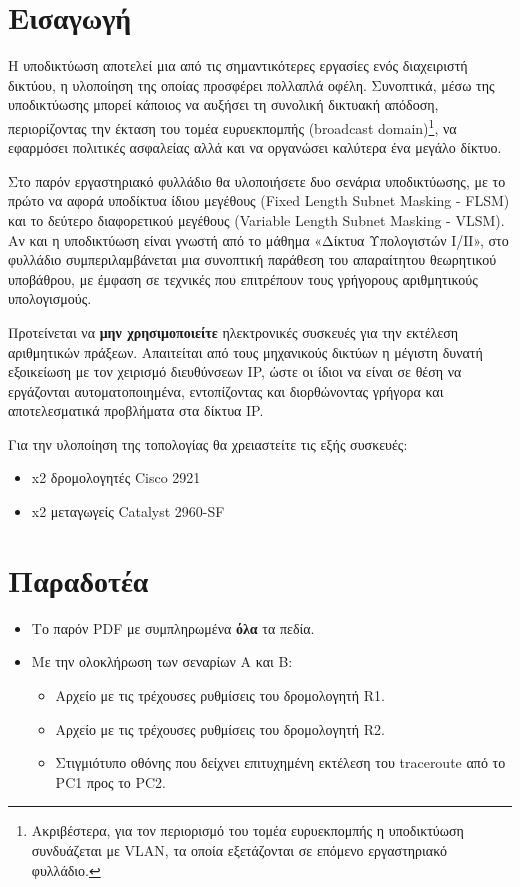 \documentclass{EdipyLabs} %
\begin{document}
\Initialize

\section*{Εισαγωγή}
Η υποδικτύωση αποτελεί μια από τις σημαντικότερες εργασίες ενός διαχειριστή δικτύου, η υλοποίηση της οποίας προσφέρει πολλαπλά οφέλη. Συνοπτικά, μέσω της υποδικτύωσης μπορεί κάποιος να αυξήσει τη συνολική δικτυακή απόδοση, περιορίζοντας την έκταση του τομέα ευρυεκπομπής (broadcast domain)\footnote{Ακριβέστερα, για τον περιορισμό του τομέα ευρυεκπομπής η υποδικτύωση συνδυάζεται με VLAN, τα οποία εξετάζονται σε επόμενο εργαστηριακό φυλλάδιο.}, να εφαρμόσει πολιτικές ασφαλείας αλλά και να οργανώσει καλύτερα ένα μεγάλο δίκτυο. 

Στο παρόν εργαστηριακό φυλλάδιο θα υλοποιήσετε δυο σενάρια υποδικτύωσης, με το πρώτο να αφορά υποδίκτυα ίδιου μεγέθους (Fixed Length Subnet Masking - FLSM) και το δεύτερο διαφορετικού μεγέθους (Variable Length Subnet Masking - VLSM). Αν και η υποδικτύωση είναι γνωστή από το μάθημα «Δίκτυα Υπολογιστών Ι/ΙΙ», στο φυλλάδιο συμπεριλαμβάνεται μια συνοπτική παράθεση του απαραίτητου θεωρητικού υποβάθρου, με έμφαση σε τεχνικές που επιτρέπουν τους γρήγορους αριθμητικούς υπολογισμούς. 

\begin{warningblock}
	Προτείνεται να \textbf{μην χρησιμοποιείτε} ηλεκτρονικές συσκευές για την εκτέλεση αριθμητικών πράξεων. Απαιτείται από τους μηχανικούς δικτύων η μέγιστη δυνατή εξοικείωση με τον χειρισμό διευθύνσεων IP, ώστε οι ίδιοι να είναι σε θέση να εργάζονται αυτοματοποιημένα, εντοπίζοντας και διορθώνοντας γρήγορα και αποτελεσματικά προβλήματα στα δίκτυα IP.
\end{warningblock}

Για την υλοποίηση της τοπολογίας θα χρειαστείτε τις εξής συσκευές:
\begin{itemize}
	\item x2 δρομολογητές Cisco 2921
	\item x2 μεταγωγείς Catalyst 2960-SF 
\end{itemize}

\section*{Παραδοτέα}
\begin{itemize}
	\item Tο παρόν PDF με συμπληρωμένα \textbf{όλα} τα πεδία.
	\item Με την ολοκλήρωση των σεναρίων Α και Β:
	\begin{itemize}
		\item Αρχείο με τις τρέχουσες ρυθμίσεις του δρομολογητή R1.
		\item Αρχείο με τις τρέχουσες ρυθμίσεις του δρομολογητή R2.
		\item Στιγμιότυπο οθόνης που δείχνει επιτυχημένη εκτέλεση του traceroute από το PC1 προς το PC2.
	\end{itemize}
\end{itemize}
\newpage
\end{document}
